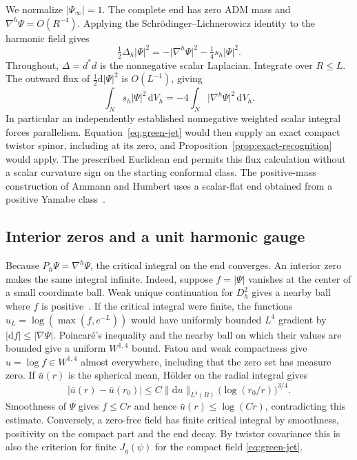 \documentclass[11pt]{article}
\numberwithin{equation}{section}
\newcommand{\dd}{\mathrm{d}}
\newcommand{\abs}[1]{\lvert #1\rvert}
\newcommand{\norm}[1]{\lVert #1\rVert}
\begin{document}
We normalize \(\abs{\Psi_\infty}=1\). The complete end has zero ADM
mass and \(\nabla^h\Psi=O(R^{-4})\). Applying the
Schr\"odinger--Lichnerowicz identity to the harmonic field gives
\[
 \tfrac12\Delta_h\abs{\Psi}^2
 =-\abs{\nabla^h\Psi}^2-\tfrac14s_h\abs{\Psi}^2 .
\]
Throughout, \(\Delta=d^*d\) is the nonnegative scalar Laplacian.
Integrate over \(R\le L\). The outward flux of \(\frac12\dd\abs{\Psi}^2\)
is \(O(L^{-1})\), giving
\begin{equation}\label{eq:green-flux}
 \int_N s_h\abs{\Psi}^2\,\dd V_h=-4\int_N\abs{\nabla^h\Psi}^2\,\dd V_h .
\end{equation}
In particular an independently established nonnegative weighted scalar
integral forces parallelism. Equation~\eqref{eq:green-jet} would then
supply an exact compact twistor spinor, including at its zero, and
Proposition~\ref{prop:exact-recognition} would apply. The prescribed
Euclidean end permits this flux calculation without a scalar
curvature sign on the starting conformal class. The positive-mass
construction of Ammann and Humbert uses a scalar-flat end obtained
from a positive Yamabe class~\cite[Theorem~2.2]{AmmannHumbert2005PositiveMass}.

\subsection{Interior zeros and a unit harmonic gauge}

Because \(P_h\Psi=\nabla^h\Psi\), the critical integral on the end
converges. An interior zero makes the same integral infinite.
Indeed, suppose \(f=\abs{\Psi}\) vanishes at the center of a small
coordinate ball. Weak unique continuation for \(D_h^2\) gives a
nearby ball where \(f\) is positive~\cite{Aronszajn1957Continuation}.
If the critical integral were finite, the functions
\(u_L=\log(\max(f,e^{-L}))\) would have uniformly bounded
\(L^4\) gradient by \(\abs{\dd f}\le\abs{\nabla\Psi}\).
Poincar\'e's inequality and the nearby ball on which their values are
bounded give a uniform \(W^{1,4}\) bound. Fatou and weak compactness
give \(u=\log f\in W^{1,4}\) almost everywhere, including that the
zero set has measure zero. If \(\bar u(r)\) is the spherical mean,
H\"older on the radial integral gives
\[
 \abs{\bar u(r)-\bar u(r_0)}
 \le C\norm{\dd u}_{L^4(B)}\bigl(\log(r_0/r)\bigr)^{3/4}.
\]
Smoothness of \(\Psi\) gives \(f\le Cr\) and hence
\(\bar u(r)\le \log(Cr)\), contradicting this estimate.
Conversely, a zero-free field has finite critical integral by
smoothness, positivity on the compact part and the end decay.
By twistor covariance this is also the criterion for finite
\(J_g(\psi)\) for the compact field \eqref{eq:green-jet}.
\end{document}
